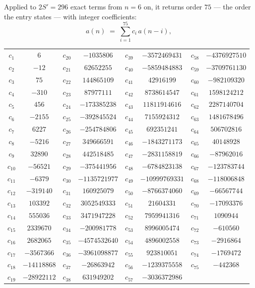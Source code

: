 \documentclass[11pt,a4paper]{article}
\theoremstyle{plain}
\theoremstyle{definition}
\begin{document}
Applied to $2S'=296$ exact terms from $n=6$ on, it returns order $75$ --- the
order the entry states --- with integer coefficients:
\[
a(n)\;=\;\sum_{i=1}^{75}c_i\,a(n-i),
\]
\begin{center}\small
\begin{tabular}{cccccccc}
$c_{1}$ & $6$ & $c_{20}$ & $-1035806$ & $c_{39}$ & $-3572469431$ & $c_{58}$ & $-4376927510$ \\
$c_{2}$ & $-12$ & $c_{21}$ & $62652255$ & $c_{40}$ & $-5859484883$ & $c_{59}$ & $-3709761130$ \\
$c_{3}$ & $75$ & $c_{22}$ & $144865109$ & $c_{41}$ & $42916199$ & $c_{60}$ & $-982109320$ \\
$c_{4}$ & $-310$ & $c_{23}$ & $87977111$ & $c_{42}$ & $8738614547$ & $c_{61}$ & $1598124212$ \\
$c_{5}$ & $456$ & $c_{24}$ & $-173385238$ & $c_{43}$ & $11811914616$ & $c_{62}$ & $2287140704$ \\
$c_{6}$ & $-2155$ & $c_{25}$ & $-392845524$ & $c_{44}$ & $7155924312$ & $c_{63}$ & $1481678496$ \\
$c_{7}$ & $6227$ & $c_{26}$ & $-254784806$ & $c_{45}$ & $692351241$ & $c_{64}$ & $506702816$ \\
$c_{8}$ & $-5216$ & $c_{27}$ & $349666591$ & $c_{46}$ & $-1843271173$ & $c_{65}$ & $40148928$ \\
$c_{9}$ & $32890$ & $c_{28}$ & $442518485$ & $c_{47}$ & $-2831158819$ & $c_{66}$ & $-87962016$ \\
$c_{10}$ & $-56521$ & $c_{29}$ & $-375441956$ & $c_{48}$ & $-6784823138$ & $c_{67}$ & $-123783744$ \\
$c_{11}$ & $-6379$ & $c_{30}$ & $-1135721977$ & $c_{49}$ & $-10999769331$ & $c_{68}$ & $-118006848$ \\
$c_{12}$ & $-319140$ & $c_{31}$ & $160925079$ & $c_{50}$ & $-8766374060$ & $c_{69}$ & $-66567744$ \\
$c_{13}$ & $103392$ & $c_{32}$ & $3052549333$ & $c_{51}$ & $21604331$ & $c_{70}$ & $-17093376$ \\
$c_{14}$ & $555036$ & $c_{33}$ & $3471947228$ & $c_{52}$ & $7959941316$ & $c_{71}$ & $1090944$ \\
$c_{15}$ & $2339670$ & $c_{34}$ & $-200981778$ & $c_{53}$ & $8996005474$ & $c_{72}$ & $-610560$ \\
$c_{16}$ & $2682065$ & $c_{35}$ & $-4574532640$ & $c_{54}$ & $4896002558$ & $c_{73}$ & $-2916864$ \\
$c_{17}$ & $-3567366$ & $c_{36}$ & $-3961098877$ & $c_{55}$ & $923810051$ & $c_{74}$ & $-1769472$ \\
$c_{18}$ & $-14118868$ & $c_{37}$ & $-26863942$ & $c_{56}$ & $-1239375558$ & $c_{75}$ & $-442368$ \\
$c_{19}$ & $-28922112$ & $c_{38}$ & $631949202$ & $c_{57}$ & $-3036372986$ &  &  \\
\end{tabular}
\end{center}
\end{document}
